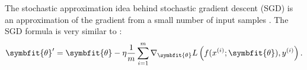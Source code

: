 The stochastic approximation idea behind stochastic gradient descent (SGD) is an approximation of the gradient from a small number of input samples \parencite{Bottou2016}. The SGD formula is very similar to :
\begin{equation}
\symbfit{\theta}^{\prime}=\symbfit{\theta}-\eta \frac{1}{m} \sum_{i=1}^{m} \nabla_{\symbfit{\theta}} L\left(f(x^{(i)}; \symbfit{\theta}), y^{(i)}\right).
\end{equation}
